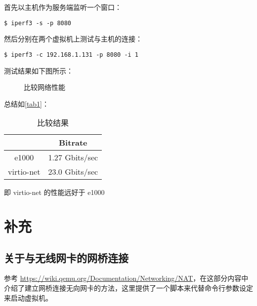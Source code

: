 \documentclass[UTF8,12pt]{ctexart}
\numberwithin{equation}{section}
\begin{document}
首先以主机作为服务端监听一个窗口：
\begin{lstlisting}
$ iperf3 -s -p 8080
\end{lstlisting}

然后分别在两个虚拟机上测试与主机的连接：
\begin{lstlisting}
$ iperf3 -c 192.168.1.131 -p 8080 -i 1
\end{lstlisting}
测试结果如下图所示：
\begin{figure}[H]
    \centering
    \label{iperf3}
    \caption{比较网络性能}
\end{figure}
总结如\autoref{tab1}：
\begin{table}[H]
    \centering
    \caption{比较结果}
    \begin{tabular}{c|c}
    \hline
    & Bitrate \\
    \hline
    e1000 & 1.27 Gbits/sec \\
    virtio-net & 23.0 Gbits/sec  \\
    \hline       
    \end{tabular}
    \label{tab1}
\end{table}
即 virtio-net 的性能远好于 e1000
\section{补充}
\subsection{关于与无线网卡的网桥连接}
参考 \url{https://wiki.qemu.org/Documentation/Networking/NAT}，在这部分内容中介绍了建立网桥连接无向网卡的方法，这里提供了一个脚本来代替命令行参数设定来启动虚拟机。
\end{document}
